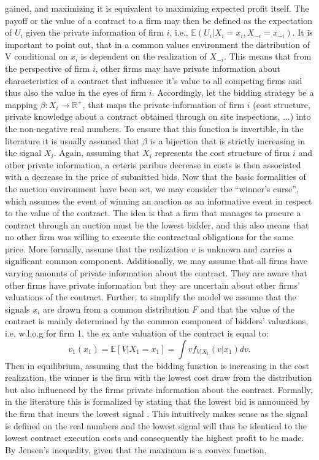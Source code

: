 \documentclass[a4paper,12pt, headsepline]{scrartcl}
\numberwithin{equation}{section}
\begin{document}
gained, and maximizing it is equivalent to maximizing expected profit itself. The payoff or the value of a contract to a firm may then be defined as the expectation of $U_i$ given the private information of firm $i$, i.e., $\mathbb{E}(U_i|X_i = x_i, X_{-i} = x_{-i})$. It is important to point out, that in a common values environment the distribution of V conditional on $x_{i}$ is dependent on the realization of $X_{-i}$. This means that from the perspective of firm $i$, other firms may have private information about characteristics of a contract that influence it's value to all competing firms and thus also the value in the eyes of firm $i$. Accordingly, let the bidding strategy be a mapping $\beta: X_i \rightarrow \mathbb{R}^+$, that maps the private information of firm $i$ (cost structure, private knowledge about a contract obtained through on site inspections, ...) into the non-negative real numbers. To ensure that this function is invertible, in the literature it is usually assumed that $\beta$ is a bijection that is strictly increasing in the signal $X_i$. Again, assuming that $X_i$ represents the cost structure of firm $i$ and other private information, a ceteris paribus decrease in costs is then associated with a decrease in the price of submitted bids. Now that the basic formalities of the auction environment have been set, we may consider the \enquote{winner's curse}, which assumes the event of winning an auction as an informative event in respect to the value of the contract. The idea is that a firm that manages to procure a contract through an auction must be the lowest bidder, and this also means that no other firm was willing to execute the contractual obligations for the same price. More formally, assume that the realization $v$ is unknown and carries a significant common component. Additionally, we may assume that all firms have varying amounts of private information about the contract. They are aware that other firms have private information but they are uncertain about other firms' valuations of the contract. Further, to simplify the model we assume that the signals $x_i$ are drawn from a common distribution $F$ and that the value of the contract is mainly determined by the common component of bidders' valuations, i.e, w.l.o.g for firm 1, the ex ante valuation of the contract is equal to:
\[
v_1(x_1) = \mathbb{E}[V|X_1 = x_1]  = \int vf_{V|X_1}(v|x_1)dv.
\]
 Then in equilibrium, assuming that the bidding function is increasing in the cost realization, the winner is the firm with the lowest cost draw from the distribution but also influenced by the firms private information about the contract. Formally, in the literature this is formalized by stating that the lowest bid is announced by the firm that incurs the lowest signal \citep{HandbookIndustrialOrga}. This intuitively makes sense as the signal is defined on the real numbers and the lowest signal will thus be identical to the lowest contract execution costs and consequently the highest profit to be made. By Jensen's inequality, given that the maximum is a convex function, 
\end{document}
